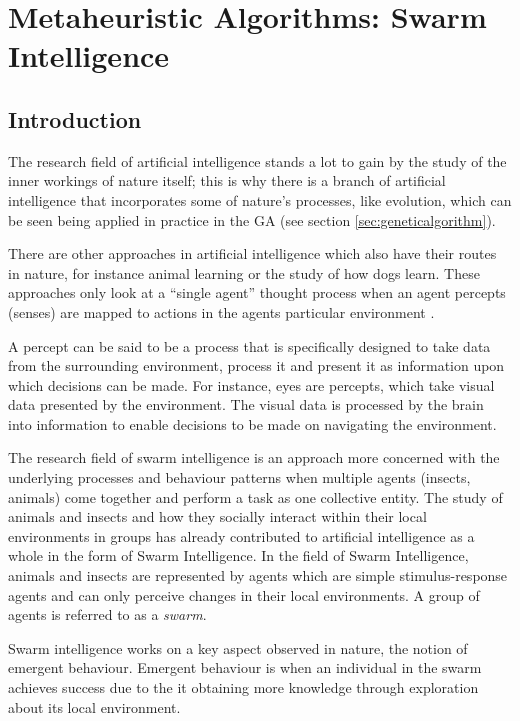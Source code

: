 \chapter[Swarm Intelligence]{Metaheuristic Algorithms: Swarm Intelligence}
\label{chpt:swarm}
\section{Introduction}
The research field of artificial intelligence stands a lot to gain by the study of the inner workings of nature itself; this is why there is a branch of artificial intelligence that incorporates some of nature's processes, like evolution, which can be seen being applied in practice in the GA (see section \ref{sec:geneticalgorithm}).

 There are other approaches in artificial intelligence which also have their routes in nature, for instance animal learning or the study of how dogs learn\cite{DLearning}. These approaches only look at a “single agent” thought process when an agent percepts (senses) are mapped to actions in the agents particular environment \cite{DLearning}. 
 
 A percept can be said to be a process that is specifically designed to take data from the surrounding environment, process it and present it as information upon which decisions can be made\cite{DLearning,AIModernApproach}. For instance, eyes are percepts, which take visual data presented by the environment\cite{DLearning,AIModernApproach}. The visual data is processed by the brain into information to enable decisions to be made on navigating the environment\cite{DLearning,AIModernApproach}.

The research field of swarm intelligence is an approach more concerned with the underlying processes and behaviour patterns when multiple agents (insects, animals) come together and perform a task as one collective entity\cite{DLearning,AIModernApproach,ChaoticSwarmIntel,BeeJobShop}.  The study of animals and insects and how they socially interact within their local environments in groups has already contributed to artificial intelligence as a whole in the form of Swarm Intelligence\cite{ChaoticSwarmIntel,BeeJobShop}.  In the field of Swarm Intelligence, animals and insects are represented by agents which are simple stimulus-response agents and can only perceive changes in their local environments. A group of agents is referred to as a \emph{swarm}.

Swarm intelligence works on a key aspect observed in nature, the notion of emergent behaviour\cite{SwarmArt,CompuIntelligenceIntro,FundamentalSwarm}. Emergent behaviour is when an individual in the swarm achieves success due to the it obtaining more knowledge through exploration about its local environment\cite{SwarmArt,CompuIntelligenceIntro,FundamentalSwarm}.


